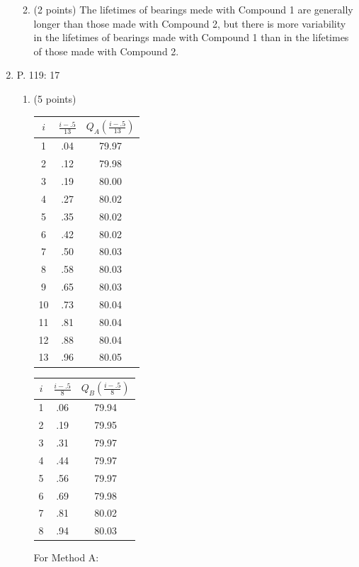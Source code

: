 \documentclass{article}
\begin{document}
\begin{enumerate}
\begin{enumerate}
{			}
		\item (2 points)
			{\color{red}
		        The lifetimes of bearings mede with Compound 1 are
			generally longer than those made with Compound 2, but
			there is more variability in the lifetimes of bearings
			made with Compound 1 than in the lifetimes of those
			made with Compound 2.
			}

	\end{enumerate}
\item P. 119: 17
	
	\begin{enumerate}
		\item (5 points)
		
				\begin{minipage}{0.5\textwidth}
					{\color{red}
					\begin{tabular}{ccc}
						$i$ & $\frac{i - .5}{13}$ & $Q_A(\frac{i -
						.5}{13})$ \\ \hline
						1 & .04 & 79.97\\
						2 & .12 & 79.98\\
						3 & .19 & 80.00\\
						4 & .27 & 80.02\\
						5 & .35 & 80.02 \\		
						6 & .42 & 80.02\\
						7 & .50 & 80.03\\
						8 & .58 & 80.03\\
						9 & .65 & 80.03\\
						10 & .73 &  80.04\\
						11 & .81 & 80.04 \\
						12 & .88 & 80.04\\
						13 & .96 & 80.05
					\end{tabular}}
				\end{minipage}%
				\begin{minipage}{0.5\textwidth}
					{\color{red}
					\begin{tabular}{ccc}
						$i$ & $\frac{i - .5}{8}$ & $Q_B(\frac{i -
						.5}{8})$ \\ \hline
						1 & .06 & 79.94\\
						2 & .19 & 79.95\\
						3 & .31 & 79.97\\
						4 & .44 & 79.97\\
						5 & .56 & 79.97 \\		
						6 & .69 & 79.98\\
						7 & .81 & 80.02\\
						8 & .94 & 80.03\\
					\end{tabular}}
						\end{minipage}
		{\color{red}
		For Method A:
		
}
\end{enumerate}
\end{enumerate}
\end{document}
